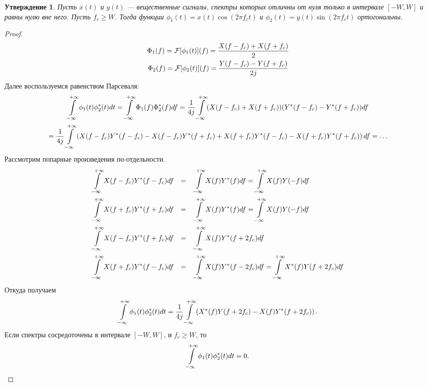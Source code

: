 \documentclass{book}
\numberwithin{theorem}{chapter}
\newtheorem{statement}{Утверждение}
\numberwithin{statement}{chapter}
\numberwithin{lemma}{chapter}
\theoremstyle{definition}
\numberwithin{task}{chapter}
\theoremstyle{remark}
\numberwithin{example}{chapter}
\theoremstyle{definition}
\numberwithin{definition}{chapter}
\theoremstyle{remark}
\theoremstyle{remark}
\numberwithin{lyrics}{section}
\begin{document}
\begin{statement}
\label{st:low:orthogonality}
Пусть $x(t)$ и $y(t)$ --- вещественные сигналы, спектры которых отличны от нуля только в интервале $[-W, W]$ и равны нулю вне него. Пусть $f_c \ge W$. Тогда функции $\phi_1(t) = x(t)\cos(2\pi f_c t)$ и $\phi_2(t) = y(t)\sin(2\pi f_c t)$ ортогональны.
\end{statement}
\begin{proof}
\begin{gather*}
\Phi_1(f) = \mathcal{F}[\phi_1(t)](f) = \frac{X(f - f_c) + X(f + f_c)}{2} \\
\Phi_2(f) = \mathcal{F}[\phi_2(t)](f) = \frac{Y(f - f_c) - Y(f + f_c)}{2j}
\end{gather*}
Далее воспользуемся равенством Парсеваля:
\begin{gather*}
\int\limits_{-\infty}^{+\infty} \phi_1(t) \phi_2^*(t) dt = \int\limits_{-\infty}^{+\infty} \Phi_1(f) \Phi^*_2(f) df = 
\frac{1}{4j} \int\limits_{-\infty}^{+\infty} (X(f - f_c) + X(f + f_c))(Y^*(f - f_c) - Y^*(f + f_c)) df
\\
= \frac{1}{4j} \int\limits_{-\infty}^{+\infty} \left(X(f - f_c) Y^*(f - f_c) - X(f - f_c)Y^*(f + f_c) + X(f + f_c) Y^*(f - f_c) - X(f + f_c)Y^*(f + f_c)\right) df = \dots \\ 
\end{gather*}
Рассмотрим попарные произведения по-отдельности.
\begin{align*}
\int\limits_{-\infty}^{+\infty} X(f - f_c) Y^*(f - f_c) df   &  & = & &  &\int\limits_{-\infty}^{+\infty} X(f) Y^*(f) df = \int\limits_{-\infty}^{+\infty} X(f) Y(-f) df \\
\int\limits_{-\infty}^{+\infty} X(f + f_c) Y^*(f + f_c) df     &  & = & &  &\int\limits_{-\infty}^{+\infty} X(f) Y^*(f) df = \int\limits_{-\infty}^{+\infty} X(f) Y(-f) df  \\  
\int\limits_{-\infty}^{+\infty} X(f - f_c) Y^*(f + f_c) df    &  & = & &  &\int\limits_{-\infty}^{+\infty} X(f) Y^*(f + 2f_c) df \\
\int\limits_{-\infty}^{+\infty} X(f + f_c) Y^*(f - f_c) df &  & = &  & &\int\limits_{-\infty}^{+\infty} X(f) Y^*(f - 2f_c) df = \int\limits_{-\infty}^{+\infty} X^*(f) Y(f + 2f_c) df
\end{align*}
Откуда получаем
\begin{gather*}
\int\limits_{-\infty}^{+\infty} \phi_1(t) \phi_2^*(t) dt = \frac{1}{4j} \int\limits_{-\infty}^{+\infty}\left(X^*(f)Y(f + 2f_c) - X(f)Y^*(f + 2f_c)\right).
\end{gather*}
Если спектры сосредоточены в интервале $[-W, W]$, и $f_c \ge W$, то
\begin{gather*}
\int\limits_{-\infty}^{+\infty} \phi_1(t) \phi_2^*(t) dt = 0.
\end{gather*}
\end{proof}
\end{document}
